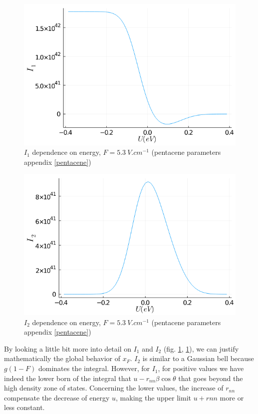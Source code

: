 \begin{figure}[!h]
    \centering
    \includegraphics*[width=.5\paperwidth]{figures/3_elec/I1.png}
    \caption{$I_1$ dependence on energy, $F = \SI{5.3}{V . cm^{-1}}$ (pentacene parameters appendix \ref{pentacene})\label{fig:3_5}}
\end{figure}


\begin{figure}[!h]
    \centering
    \includegraphics*[width=.5\paperwidth]{figures/3_elec/I2.png}
    \caption{$I_2$ dependence on energy, $F = \SI{5.3}{V . cm^{-1}}$ (pentacene parameters appendix \ref{pentacene})\label{fig:3_6}}
\end{figure}

By looking a little bit more into detail on $I_1$ and $I_2$ (fig. \ref{fig:3_5}, \ref{fig:3_5}), we can justify mathematically the global behavior of $x_F$. $I_2$ is similar to a Gaussian bell because $g(1-F)$ dominates the integral. However, for $I_1$, for positive values we have indeed the lower born of the integral that $u - r_{nn}\beta \cos \theta$ that goes beyond the high density zone of states. Concerning the lower values, the increase of $r_{nn}$ compensate the decrease of energy $u$, making the upper limit $u + rnn$ more or less constant.

